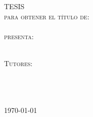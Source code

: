 \begin{titlepage}
\begin{minipage}[c][0.81\textheight][t]{0.75\textwidth}
\begin{center}
                \vspace{2cm}            

                \textsc{\LARGE T\hspace{1.5cm}E\hspace{1.5cm}S\hspace{1.5cm}I\hspace{1.5cm}S}\\[0.5cm]
                \textsc{\large para obtener el t\'itulo de:}\\[0.5cm]
                \textsc{\large \degreename}\\[0.5cm]
                \textsc{\large presenta:}\\[0.5cm]
                \textsc{\large {\authorname}}\\[2cm]          

                \vspace{0.5cm}

                {\large\scshape Tutores:\\[0.3cm] {\supname} \\[0.3cm] {\cosupname} }\\[.2in]

                \vspace{0.5cm}

                \large{\addressname}{ }{\\\today}
            \end{center}
        \end{minipage}
    \end{titlepage}